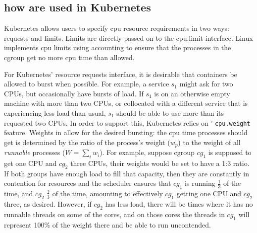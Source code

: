 



\subsection{how \cgroups{} are used in Kubernetes}

Kubernetes\cite{kubernetes} allows users to specify cpu resource
requirements in two ways: requests and limits. Limits are directly passed on to
the \cgroups{} cpu.limit interface. Linux implements cpu limits using accounting to
ensure that the processes in the cgroup get no more cpu time than
allowed.

For Kubernetes' resource requests interface, it is desirable that containers be
allowed to burst when possible. For example, a service $s_1$ might ask for two
CPUs, but occasionally have bursts of load. If $s_1$ is on an otherwise empty
machine with more than two CPUs, or collocated with a different service that is
experiencing less load than usual, $s_1$ should be able to use more than its
requested two CPUs. In order to support this, Kubernetes relies on \cgroups{}'
\texttt{cpu.weight} feature. Weights in \cgroups{} allow for the desired
bursting: the cpu time processes should get is determined by the ratio of the
process's weight ($w_p$) to the weight of all \textit{runnable} processes ($W =
\sum_i w_i$). For example, suppose cgroup $cg_1$ is supposed to get one CPU and
$cg_2$ three CPUs, their weights would be set to have a 1:3 ratio. If both
groups have enough load to fill that capacity, then they are constantly in
contention for resources and the scheduler ensures that $cg_1$ is running
$\frac{1}{3}$ of the time, and $cg_2$ $\frac{2}{3}$ of the time, amounting to
effectively $cg_1$ getting one CPU and $cg_2$ three, as desired. However, if
$cg_2$ has less load, there will be times where it has no runnable threads on
some of the cores, and on those cores the threads in $cg_1$ will represent 100\%
of the weight there and be able to run uncontended.

